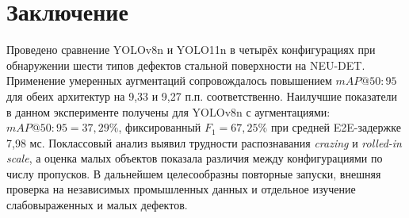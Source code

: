 \documentclass{misisarticle}
\begin{document}
\balance
\section{Заключение}
Проведено сравнение YOLOv8n и YOLO11n в четырёх конфигурациях при обнаружении шести типов дефектов стальной поверхности на NEU-DET. Применение умеренных аугментаций сопровождалось повышением $mAP@50{:}95$ для обеих архитектур на 9,33 и 9,27 п.п. соответственно. Наилучшие показатели в данном эксперименте получены для YOLOv8n с аугментациями: $mAP@50{:}95=37{,}29\%$, фиксированный $F_1=67{,}25\%$ при средней E2E-задержке 7,98 мс. Поклассовый анализ выявил трудности распознавания \textit{crazing} и \textit{rolled-in scale}, а оценка малых объектов показала различия между конфигурациями по числу пропусков. В дальнейшем целесообразны повторные запуски, внешняя проверка на независимых промышленных данных и отдельное изучение слабовыраженных и малых дефектов.
\end{document}
